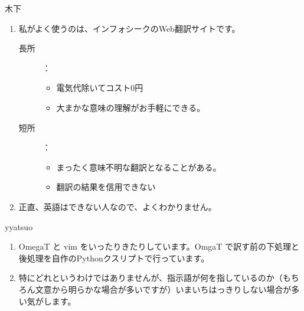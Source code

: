 \documentclass[mingoth,a4paper]{jsarticle}
\begin{document}
\begin{prework}{ 木下 }

\begin{enumerate}
\item 私がよく使うのは、インフォシークのWeb翻訳サイトです。
\begin{description}
\item [長所]：
\begin{itemize}
\item 電気代除いてコスト0円
\item 大まかな意味の理解がお手軽にできる。
\end{itemize}
\item [短所]：
\begin{itemize}
\item まったく意味不明な翻訳となることがある。
\item 翻訳の結果を信用できない
\end{itemize}
\end{description}

\item 正直、英語はできない人なので、よくわかりません。
\end{enumerate}

\end{prework}

\begin{prework}{ yyatsuo }

\begin{enumerate}
\item OmegaT と vim をいったりきたりしています。OmgaT で訳す前の下処理と後処理を自作のPythonクスリプトで行っています。

\item 特にどれというわけではありませんが、指示語が何を指しているのか（もちろん文意から明らかな場合が多いですが）いまいちはっきりしない場合が多い気がします。
\end{enumerate}

\end{prework}
\end{document}

